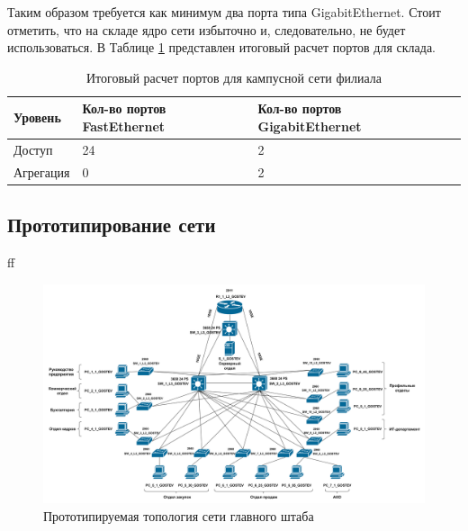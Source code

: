 \documentclass[14pt, a4paper]{extarticle}
\numberwithin{equation}{section}
\begin{document}
Таким образом требуется как минимум два порта типа GigabitEthernet.
Стоит отметить, что на складе ядро сети избыточно и, 
следовательно, не будет использоваться.
В Таблице \ref{table:warehouseCampusNet} представлен итоговый расчет портов для склада.


\begin{table}[H]
\centering
\small
\caption{Итоговый расчет портов для кампусной сети филиала}
\begin{tabular}{|m{2cm}|m{4cm}|m{3cm}|m{3.5cm}|}
\hline
\textbf{Уровень} & \textbf{Кол-во портов FastEthernet} & \textbf{Кол-во портов GigabitEthernet} \\
\hline
Доступ & 24 & 2 \\
\hline
Агрегация & 0 & 2 \\
\hline
\end{tabular}
\label{table:warehouseCampusNet}
\end{table}

\newpage
\subsection{Прототипирование сети}
ff

\begin{landscape}
\begin{figure}[H]
        \centering
        \includegraphics[scale=0.2]{topo_mainDep.png}
        \caption{Прототипируемая топология сети главного штаба}
        \label{fig:mainDepTopo}
\end{figure}
\end{landscape}
\end{document}
